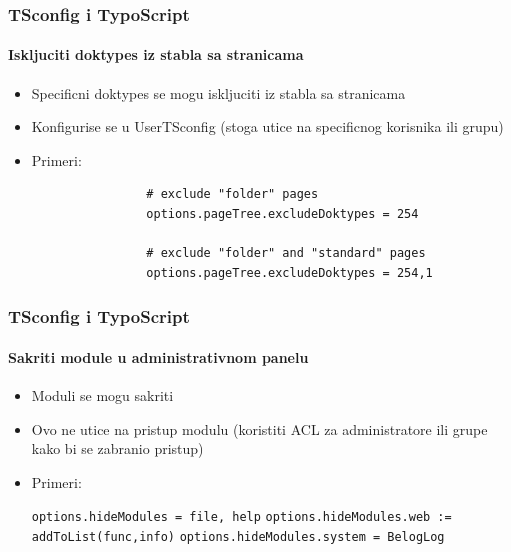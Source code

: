 
\begin{frame}[fragile]
	\frametitle{TSconfig i TypoScript}
	\framesubtitle{Iskljuciti doktypes iz stabla sa stranicama}

	\begin{itemize}

		\item Specificni doktypes se mogu iskljuciti iz stabla sa stranicama
		\item Konfigurise se u UserTSconfig (stoga utice na specificnog korisnika ili grupu)
		\item Primeri:

			\begin{lstlisting}
				# exclude "folder" pages
				options.pageTree.excludeDoktypes = 254

				# exclude "folder" and "standard" pages
				options.pageTree.excludeDoktypes = 254,1
			\end{lstlisting}

	\end{itemize}

\end{frame}


\begin{frame}[fragile]
	\frametitle{TSconfig i TypoScript}
	\framesubtitle{Sakriti module u administrativnom panelu}

	\begin{itemize}

		\item Moduli se mogu sakriti
		\item Ovo ne utice na pristup modulu\newline
			(koristiti ACL za administratore ili grupe kako bi se zabranio pristup)
		\item Primeri:

			\lstinline!options.hideModules = file, help!
			\lstinline!options.hideModules.web := addToList(func,info)!
			\lstinline!options.hideModules.system = BelogLog!

	\end{itemize}

\end{frame}

